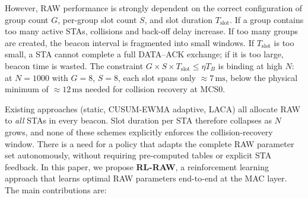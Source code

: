\documentclass[conference]{IEEEtran}
\begin{document}
However, RAW performance is strongly dependent on the correct configuration
of group count $G$, per-group slot count $S$, and slot duration $T_\text{slot}$.
If a group contains too many active STAs, collisions and back-off delay
increase.
If too many groups are created, the beacon interval is fragmented into small
windows.
If $T_\text{slot}$ is too small, a STA cannot complete a full DATA–ACK
exchange; if it is too large, beacon time is wasted.
The constraint $G \times S \times T_\text{slot} \leq \eta T_B$ is binding
at high $N$: at $N = 1000$ with $G = 8$, $S = 8$, each slot spans only
$\approx 7\,\text{ms}$, below the physical minimum of $\approx 12\,\text{ms}$
needed for collision recovery at MCS0.

Existing approaches (static, CUSUM-EWMA adaptive, LACA) all allocate
RAW to \emph{all} STAs in every beacon.
Slot duration per STA therefore collapses as $N$ grows, and none of these
schemes explicitly enforces the collision-recovery window.
There is a need for a policy that adapts the complete RAW parameter set
autonomously, without requiring pre-computed tables or explicit STA feedback.
In this paper, we propose \textbf{RL-RAW}, a reinforcement learning approach
that learns optimal RAW parameters end-to-end at the MAC layer.
The main contributions are:
\end{document}
